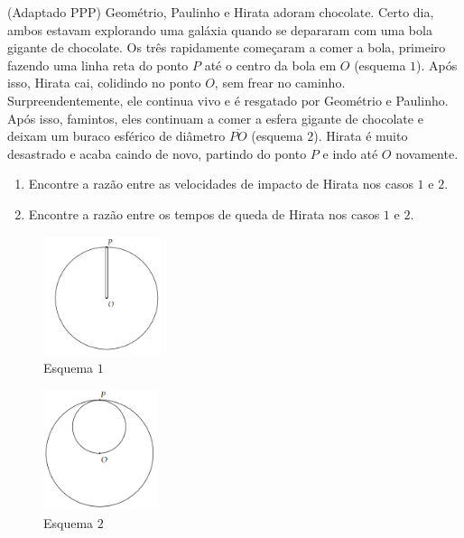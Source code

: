 \documentclass[11pt]{article}
\begin{document}
\begin{pproblem} (Adaptado PPP) Geométrio, Paulinho e Hirata adoram chocolate. Certo dia, ambos estavam explorando uma galáxia quando se depararam com uma bola gigante de chocolate. Os três rapidamente começaram a comer a bola, primeiro fazendo uma linha reta do ponto \(P\) até o centro da bola em \(O\) (esquema \(1\)). Após isso, Hirata cai, colidindo no ponto \(O\), sem frear no caminho. Surpreendentemente, ele continua vivo e é resgatado por Geométrio e Paulinho. Após isso, famintos, eles continuam a comer a esfera gigante de chocolate e deixam um buraco esférico de diâmetro \(\overline{PO}\) (esquema \(2\)). Hirata é muito desastrado e acaba caindo de novo, partindo do ponto \(P\) e indo até \(O\) novamente.
    \begin{enumerate}[label=\textbf{\alph*)}]
        \item Encontre a razão entre as velocidades de impacto de Hirata nos casos \(1\) e \(2\).
        \item Encontre a razão entre os tempos de queda de Hirata nos casos \(1\) e \(2\).
    \end{enumerate}
    \begin{paracol}{2}
        \begin{figure}[h]
            \centering
            \includegraphics[width=0.31\textwidth]{imagens/q5(1).png}
            \caption{Esquema \(1\)}
        \end{figure}
        \switchcolumn
        \begin{figure}[h]
            \centering
            \includegraphics[width=0.3\textwidth]{imagens/q5(2).png}
            \caption{Esquema \(2\)}
        \end{figure}
    \end{paracol} 

   
\end{pproblem}
\end{document}
